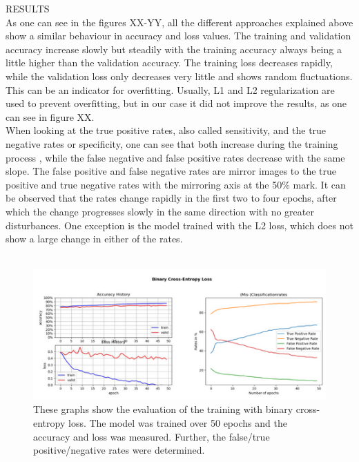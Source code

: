 RESULTS \\
As one can see in the figures XX-YY, all the different approaches explained above show a similar behaviour in accuracy and loss values. The training and validation accuracy increase slowly but steadily with the training accuracy always being a little higher than the validation accuracy. The training loss decreases rapidly, while the validation loss only decreases very little and shows random fluctuations. This can be an indicator for overfitting. Usually, L1 and L2 regularization are used to prevent overfitting, but in our case it did not improve the results, as one can see in figure XX. \\
When looking at the true positive rates, also called sensitivity, and the true negative rates or specificity, one can see that both increase during the training process , while the false negative and false positive rates decrease with the same slope. The false positive and false negative rates are mirror images to the true positive and true negative rates with the mirroring axis at the 50\% mark. It can be observed that the rates change rapidly in the first two to four epochs, after which the change progresses slowly in the same direction with no greater disturbances. One exception is the model trained with the L2 loss, which does not show a large change in either of the rates. \\
\\
\begin{figure}[h]
	\centering
	\includegraphics[scale=0.8]{Figures/chapter04/multi_crossent}
	\decoRule
	\caption[Binary Cross-Entropy Loss]{These graphs show the evaluation of the training with binary cross-entropy loss. The model was trained over 50 epochs and the accuracy and loss was measured. Further, the false/true positive/negative rates were determined.}
	\label{fig:MultilabelCrossentropy}
\end{figure}
\\
